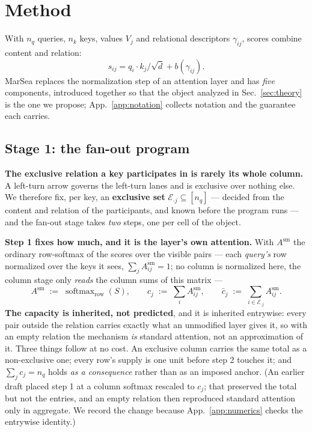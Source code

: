 \documentclass{article}
\newcommand{\softmaxop}{\operatorname{softmax}}
\begin{document}
\section{Method}
\label{sec:method}

With $n_q$ queries, $n_k$ keys, values $V_j$ and relational descriptors $\gamma_{ij}$, scores
combine content and relation:
\begin{equation}
s_{ij} = q_i\!\cdot\!k_j/\sqrt d + b(\gamma_{ij}).
\label{eq:scores}
\end{equation}
MarSea replaces the normalization step of an attention layer and has \emph{five} components,
introduced together so that the object analyzed in Sec.~\ref{sec:theory} is the one we propose;
App.~\ref{app:notation} collects notation and the guarantee each carries.

\subsection{Stage 1: the fan-out program}
\label{sec:method-fanout}
\textbf{The exclusive relation a key participates in is rarely its whole column.} A left-turn
arrow governs the left-turn lanes and is exclusive over nothing else. We therefore fix, per key,
an \textbf{exclusive set} $\mathcal{E}_{\cdot j}\subseteq[n_q]$ --- decided from the content and
relation of the participants, and known before the program runs --- and the fan-out stage takes
\emph{two} steps, one per cell of the object.

\textbf{Step 1 fixes how much, and it is the layer's own attention.} With $A^{\mathrm{sm}}$ the
ordinary row-softmax of the scores over the visible pairs --- each \emph{query's} row normalized
over the keys it sees, $\sum_jA^{\mathrm{sm}}_{ij}=1$; no column is normalized here, the column
stage only \emph{reads} the column sums of this matrix ---
\begin{equation}
A^{\mathrm{sm}} \;:=\; \softmaxop_{\mathrm{row}}(S),
\qquad
c_j \;:=\; \textstyle\sum_i A^{\mathrm{sm}}_{ij},
\qquad
\bar c_j \;:=\; \textstyle\sum_{i\in\mathcal{E}_{\cdot j}} A^{\mathrm{sm}}_{ij}.
\label{eq:step1}
\end{equation}
\textbf{The capacity is inherited, not predicted}, and it is inherited entrywise: every pair
outside the relation carries exactly what an unmodified layer gives it, so with an empty relation
the mechanism \emph{is} standard attention, not an approximation of it. Three things follow at no
cost. An exclusive column carries the same total as a non-exclusive one; every row's supply is
one unit before step 2 touches it; and $\sum_j c_j = n_q$ holds \emph{as a consequence} rather
than as an imposed anchor. (An earlier draft placed step 1 at a column softmax rescaled to
$c_j$; that preserved the total but not the entries, and an empty relation then reproduced
standard attention only in aggregate. We record the change because App.~\ref{app:numerics}
checks the entrywise identity.)
\end{document}
